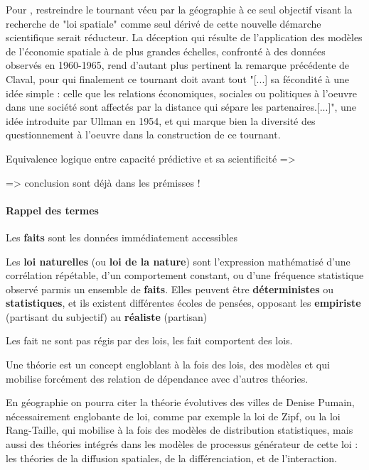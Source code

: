 {Pour \autocite[162-165]{Claval2001}, restreindre le tournant vécu par la géographie à ce seul objectif visant la recherche de "loi spatiale" comme seul dérivé de cette nouvelle démarche scientifique serait réducteur. La déception qui résulte de l'application des modèles de l'économie spatiale à de plus grandes échelles, confronté à des données observés en 1960-1965, rend d'autant plus pertinent la remarque précédente de Claval, pour qui finalement ce tournant doit avant tout "[...] sa fécondité à une idée simple : celle que les relations économiques, sociales ou politiques à l'oeuvre dans une société sont affectés par la distance qui sépare les partenaires.[...]", une idée introduite par Ullman en 1954, et qui marque bien la diversité des questionnement à l'oeuvre dans la construction de ce tournant.

Equivalence logique entre capacité prédictive et sa scientificité => 

=> conclusion sont déjà dans les prémisses !



\paragraph{Rappel des termes}

Les \textbf{faits} sont les données immédiatement accessibles

Les \textbf{loi naturelles} (ou \textbf{loi de la nature}) sont l'expression mathématisé d'une corrélation répétable, d'un comportement constant, ou d'une fréquence statistique observé parmis un ensemble de \textbf{faits}. Elles peuvent être \textbf{déterministes} ou \textbf{statistiques}, et ils existent différentes écoles de pensées, opposant les \textbf{empiriste} (partisant du subjectif) au \textbf{réaliste} (partisan)

Les fait ne sont pas régis par des lois, les fait comportent des lois.

Une théorie est un concept engloblant à la fois des lois, des modèles et qui mobilise forcément des relation de dépendance avec d'autres théories.

En géographie on pourra citer la théorie évolutives des villes de Denise Pumain, nécessairement englobante de loi, comme par exemple la loi de Zipf, ou la loi Rang-Taille, qui mobilise à la fois des modèles de distribution statistiques, mais aussi des théories intégrés dans les modèles de processus générateur de cette loi : les théories de la diffusion spatiales, de la différenciation, et de l'interaction.

}
